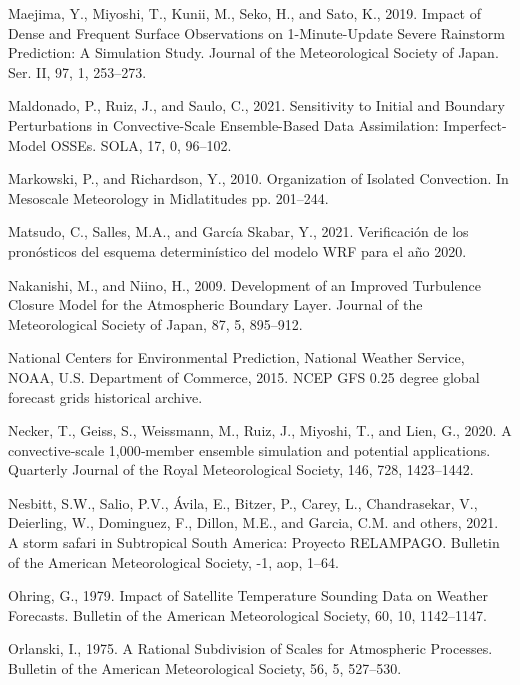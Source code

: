 \documentclass[12pt,oneside]{reedthesis}
\begin{document}
\leavevmode\hypertarget{ref-maejima2019}{}%
Maejima, Y., Miyoshi, T., Kunii, M., Seko, H., and Sato, K., 2019. Impact of Dense and Frequent Surface Observations on 1-Minute-Update Severe Rainstorm Prediction: A Simulation Study. Journal of the Meteorological Society of Japan. Ser. II, 97, 1, 253--273.

\leavevmode\hypertarget{ref-maldonado2021}{}%
Maldonado, P., Ruiz, J., and Saulo, C., 2021. Sensitivity to Initial and Boundary Perturbations in Convective-Scale Ensemble-Based Data Assimilation: Imperfect-Model OSSEs. SOLA, 17, 0, 96--102.

\leavevmode\hypertarget{ref-markowski2010}{}%
Markowski, P., and Richardson, Y., 2010. Organization of Isolated Convection. In Mesoscale Meteorology in Midlatitudes pp. 201--244.

\leavevmode\hypertarget{ref-matsudo2021}{}%
Matsudo, C., Salles, M.A., and García Skabar, Y., 2021. Verificación de los pronósticos del esquema determinístico del modelo WRF para el año 2020.

\leavevmode\hypertarget{ref-nakanishi2009}{}%
Nakanishi, M., and Niino, H., 2009. Development of an Improved Turbulence Closure Model for the Atmospheric Boundary Layer. Journal of the Meteorological Society of Japan, 87, 5, 895--912.

\leavevmode\hypertarget{ref-cisl_rda_ds084.1}{}%
National Centers for Environmental Prediction, National Weather Service, NOAA, U.S. Department of Commerce, 2015. NCEP GFS 0.25 degree global forecast grids historical archive.

\leavevmode\hypertarget{ref-necker2020}{}%
Necker, T., Geiss, S., Weissmann, M., Ruiz, J., Miyoshi, T., and Lien, G., 2020. A convective‐scale 1,000‐member ensemble simulation and potential applications. Quarterly Journal of the Royal Meteorological Society, 146, 728, 1423--1442.

\leavevmode\hypertarget{ref-nesbitt2021}{}%
Nesbitt, S.W., Salio, P.V., Ávila, E., Bitzer, P., Carey, L., Chandrasekar, V., Deierling, W., Dominguez, F., Dillon, M.E., and Garcia, C.M. and others, 2021. A storm safari in Subtropical South America: Proyecto RELAMPAGO. Bulletin of the American Meteorological Society, -1, aop, 1--64.

\leavevmode\hypertarget{ref-ohring1979}{}%
Ohring, G., 1979. Impact of Satellite Temperature Sounding Data on Weather Forecasts. Bulletin of the American Meteorological Society, 60, 10, 1142--1147.

\leavevmode\hypertarget{ref-orlanski1975}{}%
Orlanski, I., 1975. A Rational Subdivision of Scales for Atmospheric Processes. Bulletin of the American Meteorological Society, 56, 5, 527--530.
\end{document}
